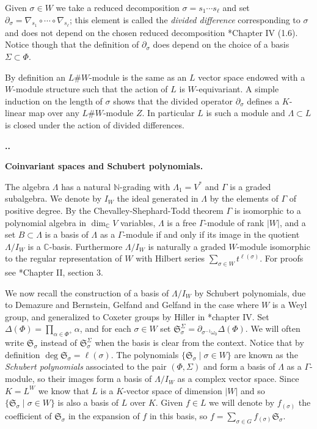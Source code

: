 \documentclass[11pt,fleqn]{amsart}
\renewcommand\thesection{\arabic{section}}
\newcounter{para}[section]
\renewcommand\thepara{\thesection.\arabic{para}}
\def\paragraph{%
 \noindent
 \refstepcounter{para}%
 \textbf{\thepara.}\hspace{1ex}%
}
\newcommand\about[1]{%
 {\bfseries#1.}%
}
\newcommand\NN{\mathbb N}
\newcommand\CC{\mathbb C}
\renewcommand\SS{\mathfrak S}
\begin{document}
Given $\sigma \in W$ we take a reduced decomposition $\sigma = s_1 \cdots 
s_{\ell}$ and set $\partial_\sigma = \nabla_{s_1} \circ \cdots \circ 
\nabla_{s_\ell}$; this element is called the \emph{divided difference} 
corresponding to $\sigma$ and does not depend on the chosen reduced 
decomposition \cite{Hiller-coxeter-book}*{Chapter IV (1.6)}. Notice though that
the definition of $\partial_\sigma$ does depend on the choice of a basis 
$\Sigma \subset \Phi$. 

By definition an $L\# W$-module is the same as an $L$ vector space endowed 
with a $W$-module structure such that the action of $L$ is $W$-equivariant. A 
simple induction on the length of $\sigma$ shows that the divided operator
$\partial_\sigma$ defines a $K$-linear map over any $L\# W$-module $Z$. 
In particular $L$ is such a module and $\Lambda \subset L$ is closed under the 
action of divided differences.

\paragraph
\about{Coinvariant spaces and Schubert polynomials}
The algebra $\Lambda$ has a natural $\NN$-grading with $\Lambda_1 = V^*$ and 
$\Gamma$ is a graded subalgebra. We denote by $I_W$ the ideal generated in 
$\Lambda$ by the elements of $\Gamma$ of positive degree. By the 
Chevalley-Shephard-Todd theorem $\Gamma$ is isomorphic to a polynomial 
algebra in $\dim_\CC V$ variables, $\Lambda$ is a free $\Gamma$-module of rank 
$|W|$, and a set $B \subset \Lambda$ is a basis of $\Lambda$ as a 
$\Gamma$-module if and only if its image in the quotient $\Lambda/I_W$ is a 
$\CC$-basis. Furthermore $\Lambda/I_W$ is naturally a graded $W$-module 
isomorphic to the regular representation of $W$ with Hilbert series 
$\sum_{\sigma \in W} t^{\ell(\sigma)}$. For proofs see 
\cite{Hiller-coxeter-book}*{Chapter II, section 3}.

We now recall the construction of a basis of $\Lambda/I_W$ by Schubert 
polynomials, due to Demazure \cite{Dem-schubert} and Bernstein, Gelfand and 
Gelfand \cite{BGG-cohomology} in the case where $W$ is a Weyl group, and
generalized to Coxeter groups by Hiller in 
\cite{Hiller-coxeter-book}*{chapter IV}. Set 
$\Delta(\Phi) = \prod_{\alpha \in \Phi^+} \alpha$, and for each $\sigma \in W$ 
set $\SS_\sigma^\Sigma = \partial_{\sigma^{-1}\omega_0} \Delta(\Phi)$. We will 
often write $\SS_\sigma$ instead of $\SS_\sigma^\Sigma$ when the basis is 
clear from the context. Notice that by definition $\deg \SS_\sigma 
= \ell(\sigma)$. The polynomials $\{\SS_\sigma \mid \sigma \in W\}$ are known 
as the \emph{Schubert polynomials} associated to the pair $(\Phi, \Sigma)$ and 
form a basis of $\Lambda$ as a $\Gamma$-module, so their images form a basis 
of $\Lambda/I_W$ as a complex vector space. Since $K = L^W$ we know that $L$ 
is a $K$-vector space of dimension $|W|$ and so $\{\SS_\sigma \mid \sigma \in 
W\}$ is also a basis of $L$ over $K$. Given $f \in L$ we will denote by 
$f_{(\sigma)}$ the coefficient of $\SS_\sigma$ in the expansion of $f$ in this 
basis, so $f = \sum_{\sigma \in G} f_{(\sigma)} \SS_\sigma$.
\end{document}

